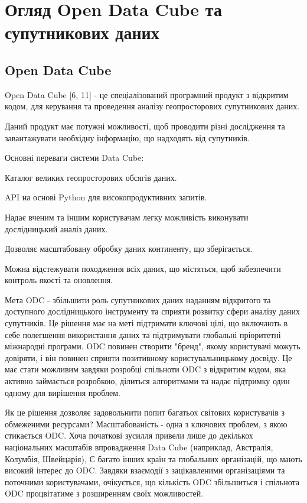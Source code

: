 \chapter{Огляд Open Data Cube та супутникових даних}
\section{Open Data Cube}
Open Data Cube [6, 11] - це спеціалізований програмний продукт з відкритим кодом, для керування та проведення аналізу геопросторових супутникових даних.

Даний продукт має потужні можливості, щоб проводити різні дослідження та завантажувати необхідну інформацію, що надходять від супутників.

Основні переваги системи Data Cube:

Каталог великих геопросторових обсягів даних.

API на основі Python для високопродуктивних запитів.

Надає вченим та іншим користувачам легку можливість виконувати дослідницький аналіз даних.

Дозволяє масштабовану обробку даних континенту, що зберігається.

Можна відстежувати походження всіх даних, що містяться, щоб забезпечити контроль якості та оновлення.

Мета ODC - збільшити роль супутникових даних наданням відкритого та доступного дослідницького інструменту та сприяти розвитку сфери аналізу даних супутників. Це рішення має на меті підтримати ключові цілі, що включають в себе полегшення використання даних та підтримувати глобальні пріоритетні міжнародні програми. ODC повинен створити "бренд", якому користувачі можуть довіряти, і він повинен сприяти позитивному користувальницькому досвіду. Це має стати можливим завдяки розробці спільноти ODC з відкритим кодом, яка активно займається розробкою, ділиться алгоритмами та надає підтримку один одному для вирішення проблем.

Як це рішення дозволяє задовольнити попит багатьох світових користувачів з обмеженими ресурсами? Масштабованість - одна з ключових проблем, з якою стикається ODC. Хоча початкові зусилля привели лише до декількох національних масштабів впровадження Data Cube (наприклад, Австралія, Колумбія, Швейцарія), Є багато інших країн та глобальних організацій, що мають високий інтерес до ODC. Завдяки взаємодії з зацікавленими організаціями та поточними користувачами, очікується, що кількість ODC збільшиться і спільнота ODC процвітатиме з розширенням своїх можливостей.


